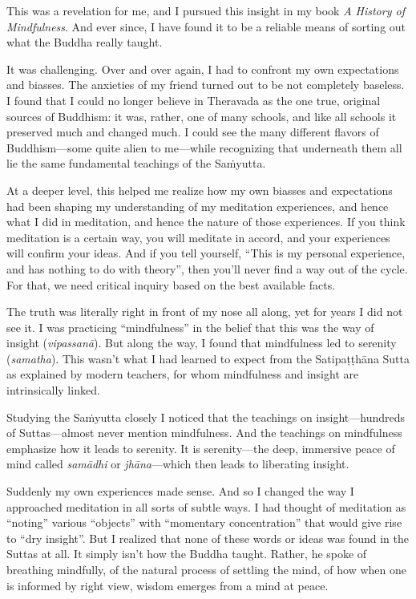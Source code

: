 \documentclass[12pt,openany]{book}%
\begin{document}
This was a revelation for me, and I pursued this insight in my book \textit{A History of Mindfulness}. And ever since, I have found it to be a reliable means of sorting out what the Buddha really taught.

It was challenging. Over and over again, I had to confront my own expectations and biasses. The anxieties of my friend turned out to be not completely baseless. I found that I could no longer believe in Theravada as the one true, original sources of Buddhism: it was, rather, one of many schools, and like all schools it preserved much and changed much. I could see the many different flavors of Buddhism—some quite alien to me—while recognizing that underneath them all lie the same fundamental teachings of the \textsanskrit{Saṁyutta}.

At a deeper level, this helped me realize how my own biasses and expectations had been shaping my understanding of my meditation experiences, and hence what I did in meditation, and hence the nature of those experiences. If you think meditation is a certain way, you will meditate in accord, and your experiences will confirm your ideas. And if you tell yourself, “This is my personal experience, and has nothing to do with theory”, then you’ll never find a way out of the cycle. For that, we need critical inquiry based on the best available facts. 

The truth was literally right in front of my nose all along, yet for years I did not see it. I was practicing “mindfulness” in the belief that this was the way of insight (\textit{\textsanskrit{vipassanā}}). But along the way, I found that mindfulness led to serenity (\textit{samatha}). This wasn’t what I had learned to expect from the \textsanskrit{Satipaṭṭhāna} Sutta as explained by modern teachers, for whom mindfulness and insight are intrinsically linked. 

Studying the \textsanskrit{Saṁyutta} closely I noticed that the teachings on insight—hundreds of Suttas—almost never mention mindfulness. And the teachings on mindfulness emphasize how it leads to serenity. It is serenity—the deep, immersive peace of mind called \textit{\textsanskrit{samādhi}} or \textit{\textsanskrit{jhāna}}—which then leads to liberating insight. 

Suddenly my own experiences made sense. And so I changed the way I approached meditation in all sorts of subtle ways. I had thought of meditation as “noting” various “objects” with “momentary concentration” that would give rise to “dry insight”. But I realized that none of these words or ideas was found in the Suttas at all. It simply isn’t how the Buddha taught. Rather, he spoke of breathing mindfully, of the natural process of settling the mind, of how when one is informed by right view, wisdom emerges from a mind at peace.
\end{document}
